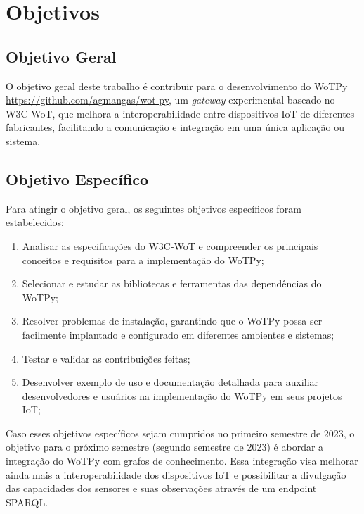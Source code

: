 \chapter{Objetivos}

\section{Objetivo Geral}


O objetivo geral deste trabalho é contribuir para o desenvolvimento do WoTPy \url{https://github.com/agmangas/wot-py}, um \textit{gateway} experimental baseado no W3C-WoT, que melhora a interoperabilidade entre dispositivos IoT de diferentes fabricantes, facilitando a comunicação e integração em uma única aplicação ou sistema.

\section{Objetivo Específico}


Para atingir o objetivo geral, os seguintes objetivos específicos foram estabelecidos:

\begin{enumerate}
    \item Analisar as especificações do W3C-WoT \cite{WoTArchitecture} e compreender os principais conceitos e requisitos para a implementação do WoTPy;
    \item Selecionar e estudar as bibliotecas e ferramentas das dependências do WoTPy;
    \item Resolver problemas de instalação, garantindo que o WoTPy possa ser facilmente implantado e configurado em diferentes ambientes e sistemas;
    \item Testar e validar as contribuições feitas;
    \item Desenvolver exemplo de uso e documentação detalhada para auxiliar desenvolvedores e usuários na implementação do WoTPy em seus projetos IoT;
\end{enumerate}

Caso esses objetivos específicos sejam cumpridos no primeiro semestre de 2023, o objetivo para o próximo semestre (segundo semestre de 2023) é abordar a integração do WoTPy com grafos de conhecimento. Essa integração visa melhorar ainda mais a interoperabilidade dos dispositivos IoT e possibilitar a divulgação das capacidades dos sensores e suas observações através de um endpoint SPARQL.

